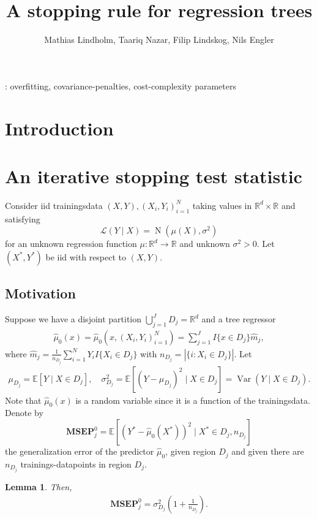 \documentclass[11pt,a4paper]{article}
\title{A stopping rule for regression trees}
\author{Mathias Lindholm, Taariq Nazar, Filip Lindskog, Nils Engler}
\newtheorem{lemma}{Lemma}
\newcommand{\calL}{\mathcal{L}}
\newcommand{\Normal}{\operatorname{N}}
\newcommand{\R}{\mathbb{R}}  %
\newcommand{\E }{\mathbb{E}}  %
\newcommand{\Var}{\operatorname{Var}}  %
\newcommand{\MSEP}{\textbf{MSEP}}
\begin{document}
\maketitle

\begin{abstract}

\end{abstract}

: overfitting, covariance-penalties, cost-complexity parameters

\section{Introduction}

\section{An iterative stopping test statistic}\label{sec:test_stat}

Consider iid trainingsdata $(X, Y), (X_i, Y_i)_{i=1}^N$ taking values in $\R^{d} \times \R$ and satisfying
$$
	\calL\left(Y \mid X \right)  = \Normal(\mu(X), \sigma^2)
$$
for an unknown regression function $\mu \colon \R^d \to \R$ and unknown $\sigma^2 > 0$. Let $(X^*, Y^*)$ be iid with respect to $(X, Y)$.

\subsection{Motivation}

Suppose we have a disjoint partition $ \bigcup_{j=1}^J D_j = \R^d$ and a tree regressor
\begin{align}\label{eq:mu_hat_0}
	\hat \mu_0(x) = \hat \mu_0(x, (X_i, Y_i)_{i=1}^N) = \sum_{j=1}^J I\{x \in D_j\} \hat m_j,
\end{align}
where $\hat m_j = \frac{1}{n_{D_j}} \sum_{i = 1}^{N} Y_i I\{X_i \in D_j\}$ with $n_{D_j} = |\{i \colon X_i \in D_j  \}|$.
Let
\begin{align*}
	\mu_{D_j} = \E[Y \mid X \in D_j ], \quad \sigma^2_{D_j} = \E[(Y-\mu_{D_j})^2 \mid X \in D_j]
	= \Var(Y \mid X \in D_j).
\end{align*}
Note that $\hat \mu_0(x)$ is a random variable since it is a function of the trainingsdata. Denote by
$$
	\MSEP^0_j = \E \left[
		\left(Y^* - \hat \mu_0(X^*)\right)^2 \mid   X^* \in D_j, n_{D_j}
		\right]
$$
the generalization error of the predictor $\hat \mu_0$, given region $D_j$ and given there are $n_{D_j}$ trainings-datapoints in region $D_j$.
\begin{lemma}\label{lem:MSEP_0}
	Then,
	\begin{align*}
		\MSEP^0_j =  \sigma_{D_j}^2\left(1 + \frac{1}{n_{D_j}}\right).
	\end{align*}
\end{lemma}
\end{document}
